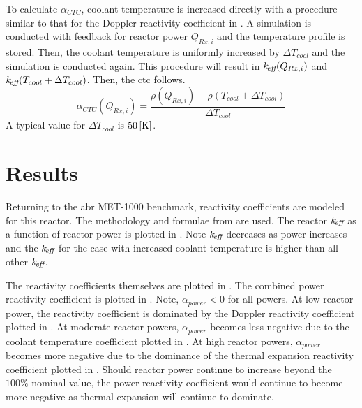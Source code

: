     To calculate $\alpha_{CTC}$, coolant temperature is increased directly with
    a procedure similar to that for the Doppler reactivity coefficient in
    . A simulation is
    conducted with feedback for reactor power $Q_{Rx,i}$ and the temperature
    profile is stored. Then, the coolant temperature is uniformly increased by
    $\Delta T_{cool}$ and the simulation is conducted again. This procedure will
    result in $k_{\!\mbox{\scriptsize \em eff}}(Q_{Rx,i})$ and ${k_{\!\mbox{\scriptsize \em eff}}(T_{cool} + \Delta T_{cool})}$. Then,
    the \gls{ctc} follows.
    \begin{equation}
      \label{eq:coolant_temperature_reactivity_coefficient}
      \alpha_{CTC}(Q_{Rx,i}) = \frac{\rho(Q_{Rx,i}) - \rho(T_{cool} + 
        \Delta T_{cool})} {\Delta T_{cool}}
    \end{equation}
    A typical value for $\Delta T_{cool}$ is $50 \left[\text{{K}}\right]$.

\section{Results}
\label{sec:results}
  Returning to the \gls{abr} MET-1000 benchmark, reactivity coefficients are
  modeled for this reactor. The methodology and formulae from
   are used. The reactor $k_{\!\mbox{\scriptsize \em eff}}$ as a function
  of reactor power is plotted in . Note $k_{\!\mbox{\scriptsize \em eff}}$ decreases
  as power increases and the $k_{\!\mbox{\scriptsize \em eff}}$ for the case with increased coolant
  temperature is higher than all other $k_{\!\mbox{\scriptsize \em eff}}$.
  
  The reactivity coefficients themselves are plotted in
  . The combined power reactivity
  coefficient is plotted in . Note,
  $\alpha_{power} < 0$ for all powers. At low reactor power, the reactivity
  coefficient is dominated by the Doppler reactivity coefficient plotted in
  . At moderate reactor powers,
  $\alpha_{power}$ becomes less negative due to the coolant temperature
  coefficient plotted in .
  At high reactor powers, $\alpha_{power}$ becomes more negative due to the
  dominance of the thermal expansion reactivity coefficient plotted in
  . Should reactor power
  continue to increase beyond the $100\%$ nominal value, the power reactivity
  coefficient would continue to become more negative as thermal expansion will
  continue to dominate.

